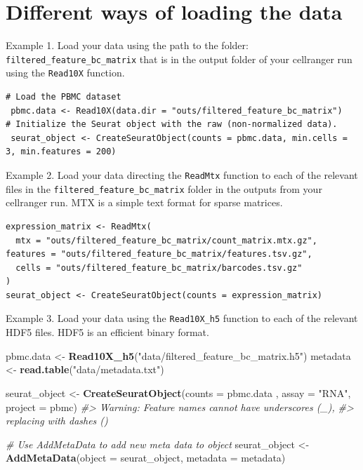 \documentclass[
]{book}
\newenvironment{Shaded}{\begin{snugshade}}{\end{snugshade}}
\newcommand{\AttributeTok}[1]{\textcolor[rgb]{0.13,0.29,0.53}{#1}}
\newcommand{\CommentTok}[1]{\textcolor[rgb]{0.56,0.35,0.01}{\textit{#1}}}
\newcommand{\FunctionTok}[1]{\textcolor[rgb]{0.13,0.29,0.53}{\textbf{#1}}}
\newcommand{\NormalTok}[1]{#1}
\newcommand{\OtherTok}[1]{\textcolor[rgb]{0.56,0.35,0.01}{#1}}
\newcommand{\StringTok}[1]{\textcolor[rgb]{0.31,0.60,0.02}{#1}}
\begin{document}
\section{Different ways of loading the data}\label{different-ways-of-loading-the-data}

Example 1. Load your data using the path to the folder: \texttt{filtered\_feature\_bc\_matrix} that is in the output folder of your cellranger run using the \texttt{Read10X} function.

\begin{verbatim}
# Load the PBMC dataset
 pbmc.data <- Read10X(data.dir = "outs/filtered_feature_bc_matrix")
# Initialize the Seurat object with the raw (non-normalized data).
 seurat_object <- CreateSeuratObject(counts = pbmc.data, min.cells = 3, min.features = 200)
\end{verbatim}

Example 2. Load your data directing the \texttt{ReadMtx} function to each of the relevant files in the \texttt{filtered\_feature\_bc\_matrix} folder in the outputs from your cellranger run. MTX is a simple text format for sparse matrices.

\begin{verbatim}
expression_matrix <- ReadMtx(
  mtx = "outs/filtered_feature_bc_matrix/count_matrix.mtx.gz", features = "outs/filtered_feature_bc_matrix/features.tsv.gz",
  cells = "outs/filtered_feature_bc_matrix/barcodes.tsv.gz"
)
seurat_object <- CreateSeuratObject(counts = expression_matrix)
\end{verbatim}

Example 3. Load your data using the \texttt{Read10X\_h5} function to each of the relevant HDF5 files. HDF5 is an efficient binary format.

\begin{Shaded}
\begin{Highlighting}[]
\NormalTok{pbmc.data }\OtherTok{\textless{}{-}} \FunctionTok{Read10X\_h5}\NormalTok{(}\StringTok{"data/filtered\_feature\_bc\_matrix.h5"}\NormalTok{)}
\NormalTok{metadata }\OtherTok{\textless{}{-}} \FunctionTok{read.table}\NormalTok{(}\StringTok{"data/metadata.txt"}\NormalTok{)}
  
\NormalTok{seurat\_object }\OtherTok{\textless{}{-}} \FunctionTok{CreateSeuratObject}\NormalTok{(}\AttributeTok{counts =}\NormalTok{ pbmc.data ,}
                                 \AttributeTok{assay =} \StringTok{"RNA"}\NormalTok{, }\AttributeTok{project =} \StringTok{\textquotesingle{}pbmc\textquotesingle{}}\NormalTok{)}
\CommentTok{\#\textgreater{} Warning: Feature names cannot have underscores (\textquotesingle{}\_\textquotesingle{}),}
\CommentTok{\#\textgreater{} replacing with dashes (\textquotesingle{}{-}\textquotesingle{})}

\CommentTok{\# Use AddMetaData to add new meta data to object}
\NormalTok{seurat\_object  }\OtherTok{\textless{}{-}} \FunctionTok{AddMetaData}\NormalTok{(}\AttributeTok{object =}\NormalTok{ seurat\_object, }\AttributeTok{metadata =}\NormalTok{ metadata)}
\end{Highlighting}
\end{Shaded}
\end{document}
